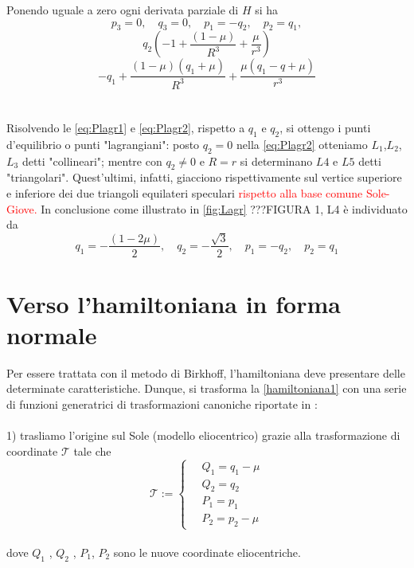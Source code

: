 \documentclass[a4paper,11pt,titlepage]{report}
\theoremstyle{definition}
\theoremstyle{plain}
\begin{document}
Ponendo uguale a zero ogni derivata parziale di $H$ si ha
$$p_3=0, \quad q_3=0,\quad p_1=-q_2,\quad p_2=q_1,$$ 
\begin{equation} 
\label{eq:Plagr1}
q_2(-1+ \frac{(1-\mu)}{R^{3}} + \frac{\mu}{r^{3}} )  
\end{equation}
\begin{equation} 
\label{eq:Plagr2}
-q_1 + \frac{(1-\mu)(q_1+\mu)}{R^{3}} + \frac{\mu (q_1-q+\mu)}{r^{3}} \end{equation}
\\\\Risolvendo le \ref{eq:Plagr1} e \ref{eq:Plagr2}, rispetto a $q_1$ e $q_2$, si ottengo i punti d'equilibrio o punti "lagrangiani": posto $q_2=0$ nella \ref{eq:Plagr2} otteniamo $L_1$,$L_2$,$L_3$ detti "collineari"; mentre con $q_2\neq0$ e $R=r$ si determinano $L4$ e $L5$ detti "triangolari". Quest'ultimi, infatti, giacciono rispettivamente sul vertice superiore e inferiore dei due triangoli equilateri speculari \textcolor{red}{rispetto alla base comune Sole-Giove.}
In conclusione come illustrato in \ref{fig:Lagr} ???FIGURA 1, L4 è individuato da $$ q_1 = - \frac{(1- 2\mu)}{2}, \quad q_2 = - \frac{\sqrt{3}}{2}, \quad p_1 = - q_2, \quad p_2 = q_1 $$
\section{Verso l'hamiltoniana in forma normale}

Per essere trattata con il metodo di Birkhoff, l'hamiltoniana deve presentare delle determinate caratteristiche. Dunque, si trasforma la \ref{hamiltoniana1} con una serie di funzioni generatrici di trasformazioni canoniche riportate in \cite{OTSA}:
\\\\1) trasliamo l'origine sul Sole (modello eliocentrico) grazie alla trasformazione di coordinate $\mathcal{T}$ tale che $$\mathcal{T} := 
\begin{cases}
	\quad Q_1 =q_1 -\mu   \\
	\quad Q_2 =q_2  \\
	\quad P_1 =p_1  \\
	\quad P_2 = p_2 - \mu 
\end{cases} 
$$
\\dove $ Q_1 $ , $ Q_2 $ , $ P_1 $, $ P_2 $ sono le nuove coordinate eliocentriche.
\end{document}
